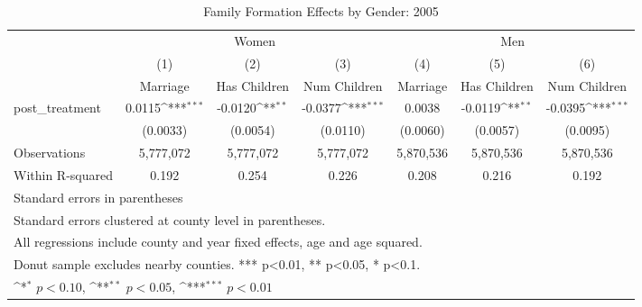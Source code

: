 \begin{table}[htbp]\centering
\def\sym#1{\ifmmode^{#1}\else\(^{#1}\)\fi}
\caption{Family Formation Effects by Gender: 2005}
\begin{tabular}{l*{6}{c}}
\hline\hline
            &\multicolumn{3}{c}{Women}                                        &\multicolumn{3}{c}{Men}                                          \\\cmidrule(lr){2-4}\cmidrule(lr){5-7}
            &\multicolumn{1}{c}{(1)}&\multicolumn{1}{c}{(2)}&\multicolumn{1}{c}{(3)}&\multicolumn{1}{c}{(4)}&\multicolumn{1}{c}{(5)}&\multicolumn{1}{c}{(6)}\\
            &\multicolumn{1}{c}{Marriage}&\multicolumn{1}{c}{Has Children}&\multicolumn{1}{c}{Num Children}&\multicolumn{1}{c}{Marriage}&\multicolumn{1}{c}{Has Children}&\multicolumn{1}{c}{Num Children}\\
\hline
post\_treatment&      0.0115\sym{***}&     -0.0120\sym{**} &     -0.0377\sym{***}&      0.0038         &     -0.0119\sym{**} &     -0.0395\sym{***}\\
            &    (0.0033)         &    (0.0054)         &    (0.0110)         &    (0.0060)         &    (0.0057)         &    (0.0095)         \\
\hline
Observations&   5,777,072         &   5,777,072         &   5,777,072         &   5,870,536         &   5,870,536         &   5,870,536         \\
Within R-squared&       0.192         &       0.254         &       0.226         &       0.208         &       0.216         &       0.192         \\
\hline\hline
\multicolumn{7}{l}{\footnotesize Standard errors in parentheses}\\
\multicolumn{7}{l}{\footnotesize Standard errors clustered at county level in parentheses.}\\
\multicolumn{7}{l}{\footnotesize All regressions include county and year fixed effects, age and age squared.}\\
\multicolumn{7}{l}{\footnotesize Donut sample excludes nearby counties. *** p<0.01, ** p<0.05, * p<0.1.}\\
\multicolumn{7}{l}{\footnotesize \sym{*} \(p<0.10\), \sym{**} \(p<0.05\), \sym{***} \(p<0.01\)}\\
\end{tabular}
\end{table}
